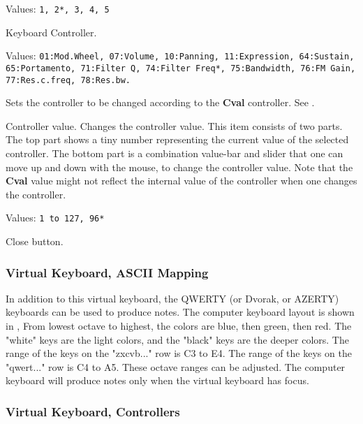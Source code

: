    Values: \texttt{1, 2*, 3, 4, 5}

   Keyboard Controller.

   Values: \texttt{01:Mod.Wheel, 07:Volume, 10:Panning,
      11:Expression, 64:Sustain, 65:Portamento, 71:Filter Q,
      74:Filter Freq*, 75:Bandwidth, 76:FM Gain,
      77:Res.c.freq, 78:Res.bw.}

   Sets the controller to be changed according to the \textbf{Cval}
   controller.
   See .

   Controller value.
   Changes the controller value.
   This item consists of two parts.  The top part shows a tiny
   number representing the current value of the selected controller.
   The bottom part is a combination value-bar and slider that one
   can move up and down with the mouse, to change the controller value.
   Note that the \textbf{Cval} value might not reflect the
   internal value of the controller when one changes the controller.

   Values: \texttt{1 to 127, 96*}

   Close button.

\subsubsection{Virtual Keyboard, ASCII Mapping}
\label{subsubsec:virtual_keyboard_ascii}

   In addition to this virtual keyboard, the QWERTY (or Dvorak, or AZERTY)
   keyboards can be used to produce notes.
   The computer keyboard layout is shown in
   ,
   From lowest octave to highest, the colors are blue, then green, then red.
   The "white" keys are the light colors, and the "black" keys are the
   deeper colors.
   The range of the keys on the "zxcvb..." row is C3 to E4.
   The range of the keys on the "qwert..." row is C4 to A5.
   These octave ranges can be adjusted.
   The computer keyboard will produce notes only when the virtual keyboard
   has focus.

\subsubsection{Virtual Keyboard, Controllers}
\label{subsubsec:virtual_keyboard_controllers}

